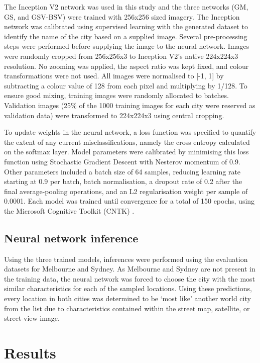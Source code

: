\documentclass[10pt,letterpaper,hidelinks]{article}
\begin{document}
The Inception V2 network was used in this study and the three networks (GM, GS, and GSV-BSV) were trained with 256x256 sized imagery. The Inception network was calibrated using supervised learning with the generated dataset to identify the name of the city based on a supplied image. Several pre-processing steps were performed before supplying the image to the neural network. Images were randomly cropped from 256x256x3 to Inception V2's native 224x224x3 resolution. No zooming was applied, the aspect ratio was kept fixed, and colour transformations were not used. All images were normalised to [-1, 1] by subtracting a colour value of 128 from each pixel and multiplying by 1/128. To ensure good mixing, training images were randomly allocated to batches. Validation images (25\% of the 1000 training images for each city were reserved as validation data) were transformed to 224x224x3 using central cropping.


To update weights in the neural network, a loss function was specified to quantify the extent of any current misclassifications, namely the cross entropy calculated on the softmax layer. Model parameters were calibrated by minimising this loss function using Stochastic Gradient Descent with Nesterov momentum of 0.9. Other parameters included a batch size of 64 samples, reducing learning rate starting at 0.9 per batch, batch normalisation, a dropout rate of 0.2 after the final average-pooling operations, and an L2 regularisation weight per sample of 0.0001. Each model was trained until convergence for a total of 150 epochs, using the Microsoft Cognitive Toolkit (CNTK) \cite{Yu2015}. 


\subsection*{Neural network inference}\label{sec:methods5}    
Using the three trained models, inferences were performed using the evaluation datasets for Melbourne and Sydney. As Melbourne and Sydney are not present in the training data, the neural network was forced to choose the city with the most similar characteristics for each of the sampled locations. Using these predictions, every location in both cities was determined to be `most like' another world city from the list due to  characteristics contained within the street map, satellite, or street-view image.

\section*{Results}\label{sec:results}
\end{document}
